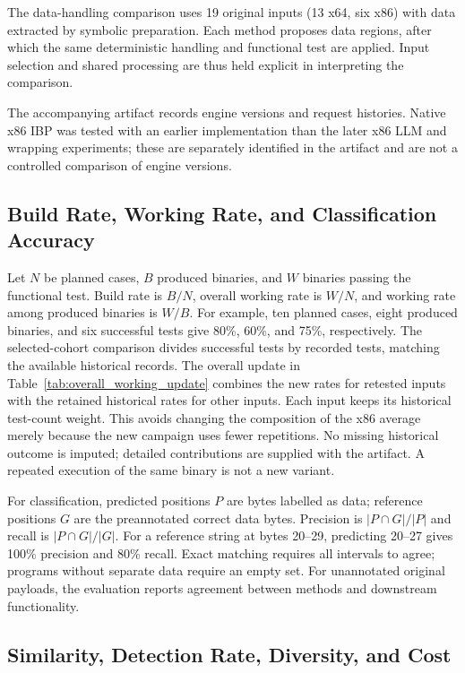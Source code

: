 The data-handling comparison uses 19 original inputs (13 x64,
six x86) with data extracted by symbolic preparation. Each method proposes
data regions, after which the same deterministic handling and functional
test are applied. Input selection and shared processing are thus held
explicit in interpreting the comparison.

The accompanying artifact records engine versions and request histories.
Native x86 IBP was tested with an earlier implementation than the later
x86 LLM and wrapping experiments; these are separately identified in the
artifact and are not a controlled comparison of engine versions.

\subsection{Build Rate, Working Rate, and Classification Accuracy}
Let $N$ be planned cases, $B$ produced binaries, and $W$ binaries passing
the functional test. Build rate is $B/N$, overall working rate is $W/N$,
and working rate among produced binaries is $W/B$.
For example, ten planned cases, eight produced binaries, and six successful
tests give 80\%, 60\%, and 75\%, respectively. The selected-cohort comparison divides
successful tests by recorded tests, matching the available historical
records. The overall update in Table~\ref{tab:overall_working_update}
combines the new rates for retested inputs with the retained historical
rates for other inputs. Each input keeps its historical test-count weight.
This avoids changing the composition of the x86 average merely because
the new campaign uses fewer repetitions. No missing historical outcome is
imputed; detailed contributions are supplied with the artifact. A repeated execution of the same binary is not a new variant.

For classification, predicted positions $P$ are bytes labelled as data;
reference positions $G$ are the preannotated correct data bytes. Precision
is $|P\cap G|/|P|$ and recall is $|P\cap G|/|G|$. For a reference string
at bytes 20--29, predicting 20--27 gives 100\% precision and 80\% recall.
Exact matching requires all intervals to agree; programs without separate
data require an empty set. For unannotated original payloads, the evaluation
reports agreement between methods and downstream functionality.

\subsection{Similarity, Detection Rate, Diversity, and Cost}
